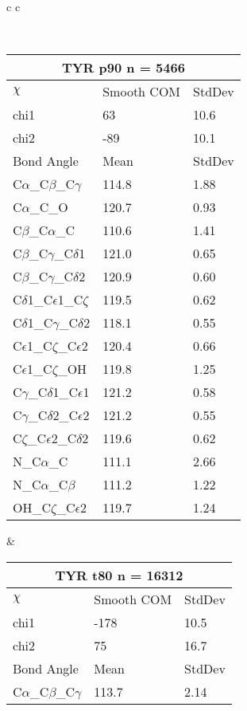 \begin{longtable}{ c c }

\caption{TYR Central Values}\\
  \begin{tabular}{ l l l }
  \toprule
  \multicolumn{3}{c}{TYR \textbf{p90} n = 5466} \\ \toprule
  $\chi$       & Smooth COM & StdDev \\ \midrule
  chi1 & 63 & 10.6 \\ 
  chi2 & -89 & 10.1 \\ \midrule
  Bond Angle   & Mean     & StdDev \\ \midrule
  C$\alpha$\_C$\beta$\_C$\gamma$ & 114.8 & 1.88\\
  C$\alpha$\_C\_O & 120.7 & 0.93\\
  C$\beta$\_C$\alpha$\_C & 110.6 & 1.41\\
  C$\beta$\_C$\gamma$\_C$\delta$1 & 121.0 & 0.65\\
  C$\beta$\_C$\gamma$\_C$\delta$2 & 120.9 & 0.60\\
  C$\delta$1\_C$\epsilon$1\_C$\zeta$ & 119.5 & 0.62\\
  C$\delta$1\_C$\gamma$\_C$\delta$2 & 118.1 & 0.55\\
  C$\epsilon$1\_C$\zeta$\_C$\epsilon$2 & 120.4 & 0.66\\
  C$\epsilon$1\_C$\zeta$\_OH & 119.8 & 1.25\\
  C$\gamma$\_C$\delta$1\_C$\epsilon$1 & 121.2 & 0.58\\
  C$\gamma$\_C$\delta$2\_C$\epsilon$2 & 121.2 & 0.55\\
  C$\zeta$\_C$\epsilon$2\_C$\delta$2 & 119.6 & 0.62\\
  N\_C$\alpha$\_C & 111.1 & 2.66\\
  N\_C$\alpha$\_C$\beta$ & 111.2 & 1.22\\
  OH\_C$\zeta$\_C$\epsilon$2 & 119.7 & 1.24\\
  \bottomrule
  \end{tabular}
  &
  \begin{tabular}{ l l l }
  \toprule
  \multicolumn{3}{c}{TYR \textbf{t80} n = 16312} \\ \toprule
  $\chi$       & Smooth COM & StdDev \\ \midrule
  chi1 & -178 & 10.5 \\ 
  chi2 & 75 & 16.7 \\ \midrule
  Bond Angle   & Mean     & StdDev \\ \midrule
  C$\alpha$\_C$\beta$\_C$\gamma$ & 113.7 & 2.14\\

\end{tabular}
\end{longtable}
